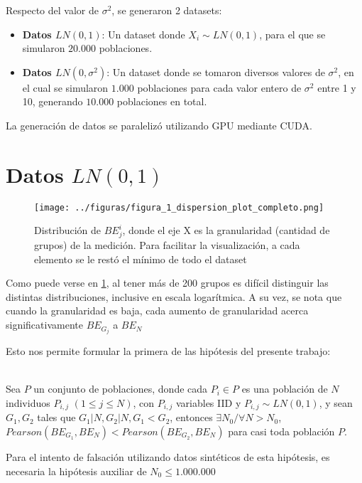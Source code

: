 Respecto del valor de $\sigma^2$, se generaron 2 datasets:

\begin{itemize}
    \item \textbf{Datos $LN(0,1)$}: Un dataset donde $X_i \sim LN(0,1)$, para el que se simularon $20.000$ poblaciones.
    \item \textbf{Datos $LN(0,\sigma^2)$}: Un dataset donde se tomaron diversos valores de $\sigma^2$, en el cual se simularon $1.000$ poblaciones para cada valor entero de $\sigma^2$ entre 1 y 10, generando $10.000$ poblaciones en total.
\end{itemize}

La generación de datos se paralelizó utilizando GPU mediante CUDA\cite{lasorsa2024simluacion_cuda}.

\section{Datos $LN(0,1)$}

\begin{figure}[H] %
    \centering %
    \texttt{[image: ../figuras/figura\_1\_dispersion\_plot\_completo.png]} %
    \caption{Distribución de $BE_j^i$, donde el eje X es la granularidad (cantidad de grupos) de la medición. Para facilitar la visualización, a cada elemento se le restó el mínimo de todo el dataset}
    \label{fig:1} %
\end{figure}

Como puede verse en \ref{fig:1}, al tener más de 200 grupos es difícil distinguir las distintas distribuciones, inclusive en escala logarítmica. A su vez, se nota que cuando la granularidad es baja, cada aumento de granularidad acerca significativamente $BE_{G_j}$ a $BE_N$

Esto nos permite formular la primera de las hipótesis del presente trabajo:

\begin{hipotesis}\label{hipo:1}
    \\
    Sea $P$ un conjunto de poblaciones, donde cada $P_i \in P$ es una población de $N$ individuos $P_{i,j}$ $(1 \leq j \leq N)$, con $P_{i,j}$ variables IID y $P_{i,j} \sim LN(0,1)$, y sean $G_1, G_2$ tales que $G_1|N, G_2|N, G_1 < G_2$, entonces $\exists N_0 / \forall N > N_0 $, $Pearson(BE_{G_1},BE_N) < Pearson(BE_{G_2},BE_N)$ para casi toda población $P$.
    
    Para el intento de falsación utilizando datos sintéticos de esta hipótesis, es necesaria la hipótesis auxiliar de $N_0 \leq 1.000.000$    
%
\end{hipotesis}

